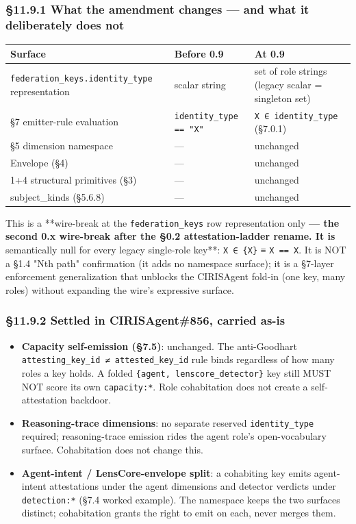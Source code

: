 \documentclass[10pt]{article}
\begin{document}
\subsubsection*{§11.9.1 What the amendment changes — and what it deliberately does not}


{\footnotesize
\begin{longtable}{|p{5.33cm}|p{5.33cm}|p{5.33cm}|}\hline
\textbf{Surface} & \textbf{Before 0.9} & \textbf{At 0.9} \\ \hline\endhead
\texttt{federation\_keys.identity\_type} representation & scalar string & set of role strings (legacy scalar = singleton set) \\ \hline
§7 emitter-rule evaluation & \texttt{identity\_type == "X"} & \texttt{X ∈ identity\_type} (§7.0.1) \\ \hline
§5 dimension namespace & — & unchanged \\ \hline
Envelope (§4) & — & unchanged \\ \hline
1+4 structural primitives (§3) & — & unchanged \\ \hline
subject\_kinds (§5.6.8) & — & unchanged \\ \hline
\end{longtable}}


This is a **wire-break at the \texttt{federation\_keys} row representation only\textbf{ — the second 0.x wire-break after the §0.2 attestation-ladder rename. It is }semantically null for every legacy single-role key**: \texttt{X ∈ \{X\}} ≡ \texttt{X == X}. It is NOT a §1.4 "Nth path" confirmation (it adds no namespace surface); it is a §7-layer enforcement generalization that unblocks the CIRISAgent fold-in (one key, many roles) without expanding the wire's expressive surface.


\subsubsection*{§11.9.2 Settled in CIRISAgent\#856, carried as-is}


\begin{itemize}\setlength\itemsep{0pt}
\item \textbf{Capacity self-emission (§7.5)}: unchanged. The anti-Goodhart \texttt{attesting\_key\_id ≠ attested\_key\_id} rule binds regardless of how many roles a key holds. A folded \texttt{\{agent, lenscore\_detector\}} key still MUST NOT score its own \texttt{capacity:*}. Role cohabitation does not create a self-attestation backdoor.
\item \textbf{Reasoning-trace dimensions}: no separate reserved \texttt{identity\_type} required; reasoning-trace emission rides the agent role's open-vocabulary surface. Cohabitation does not change this.
\item \textbf{Agent-intent / LensCore-envelope split}: a cohabiting key emits agent-intent attestations under the agent dimensions and detector verdicts under \texttt{detection:*} (§7.4 worked example). The namespace keeps the two surfaces distinct; cohabitation grants the right to emit on each, never merges them.
\end{itemize}
\end{document}
